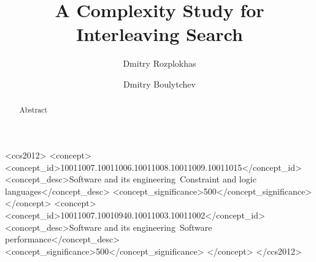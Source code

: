 \documentclass[acmsmall, anonymous, review]{acmart}
\begin{document}
\title{A Complexity Study for Interleaving Search}

\author{Dmitry Rozplokhas}
\author{Dmitry Boulytchev}


\begin{abstract}
  Abstract
\end{abstract}

\begin{CCSXML}
<ccs2012>
<concept>
<concept_id>10011007.10011006.10011008.10011009.10011015</concept_id>
<concept_desc>Software and its engineering~Constraint and logic languages</concept_desc>
<concept_significance>500</concept_significance>
</concept>
<concept>
<concept_id>10011007.10010940.10011003.10011002</concept_id>
<concept_desc>Software and its engineering~Software performance</concept_desc>
<concept_significance>500</concept_significance>
</concept>
</ccs2012>
\end{CCSXML}


\end{document}
